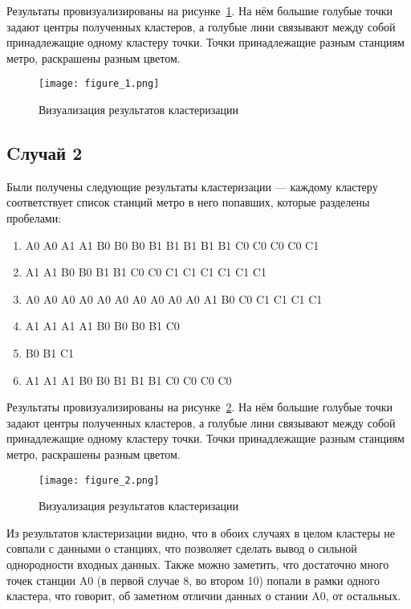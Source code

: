 \documentclass[12pt,a4paper,oneside]{extarticle}
\begin{document}
        Результаты провизуализированы на рисунке~\ref{pic:case1}. На нём большие голубые точки задают центры полученных кластеров, а голубые лини связывают между собой принадлежащие одному кластеру точки. Точки принадлежащие разным станциям метро, раскрашены разным цветом.

        \begin{figure}[ht!]
            \center
            \texttt{[image: figure\_1.png]}
            \caption{Визуализация результатов кластеризации}
            \label{pic:case1}
        \end{figure}

    \subsection{Cлучай 2}
        Были получены следующие результаты кластеризации --- каждому кластеру соответствует список станций метро в него попавших, которые разделены пробелами:
        \begin{enumerate}
            \item A0 A0 A1 A1 B0 B0 B0 B1 B1 B1 B1 B1 C0 C0 C0 C0 C1 
            \item A1 A1 B0 B0 B1 B1 C0 C0 C1 C1 C1 C1 C1 C1 
            \item A0 A0 A0 A0 A0 A0 A0 A0 A0 A0 A1 B0 C0 C1 C1 C1 C1 
            \item A1 A1 A1 A1 B0 B0 B0 B1 C0 
            \item B0 B1 C1 
            \item A1 A1 A1 B0 B0 B1 B1 B1 C0 C0 C0 C0
        \end{enumerate}

        Результаты провизуализированы на рисунке~\ref{pic:case2}. На нём большие голубые точки задают центры полученных кластеров, а голубые лини связывают между собой принадлежащие одному кластеру точки. Точки принадлежащие разным станциям метро, раскрашены разным цветом.

        \begin{figure}[ht!]
            \center
            \texttt{[image: figure\_2.png]}
            \caption{Визуализация результатов кластеризации}
            \label{pic:case2}
        \end{figure}

    Из результатов кластеризации видно, что в обоих случаях в целом кластеры не совпали с данными о станциях, что позволяет сделать вывод о сильной однородности входных данных. Также можно заметить, что достаточно много точек станции A0 (в первой случае 8, во втором 10) попали в рамки одного кластера, что говорит, об заметном отличии данных о стании A0, от остальных.
\end{document}
